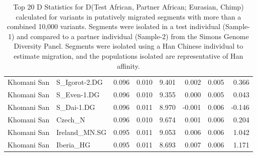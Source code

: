 \documentclass{article}
\begin{document}
\begin{table}[ht]
\begin{tabular}{rlrrrrrr}
  Khomani San & S\_Igorot-2.DG & 0.096 & 0.010 & 9.401 & 0.002 & 0.005 & 0.366 \\ 
  Khomani San & S\_Even-1.DG & 0.096 & 0.010 & 9.355 & 0.000 & 0.005 & 0.043 \\ 
  Khomani San & S\_Dai-1.DG & 0.096 & 0.011 & 8.970 & -0.001 & 0.006 & -0.146 \\ 
  Khomani San & Czech\_N & 0.096 & 0.010 & 9.674 & 0.001 & 0.006 & 0.204 \\ 
  Khomani San & Ireland\_MN.SG & 0.095 & 0.011 & 9.053 & 0.006 & 0.006 & 1.042 \\ 
  Khomani San & Iberia\_HG & 0.095 & 0.011 & 8.693 & 0.007 & 0.006 & 1.171 \\ 
   \hline
\end{tabular}
\caption{Top 20 D Statistics for D(Test African, Partner African; Eurasian, Chimp) calculated for variants in putatively migrated segments with more than a combined 10,000 variants. Segments were isolated in a test individual (Sample-1) and compared to a partner individual (Sample-2) from the Simons Genome Diversity Panel. Segments were isolated using a Han Chinese individual to estimate migration, and the populations isolated are representative of Han affinity.} 
\label{dstats:top20m}
\end{table}
\end{document}
